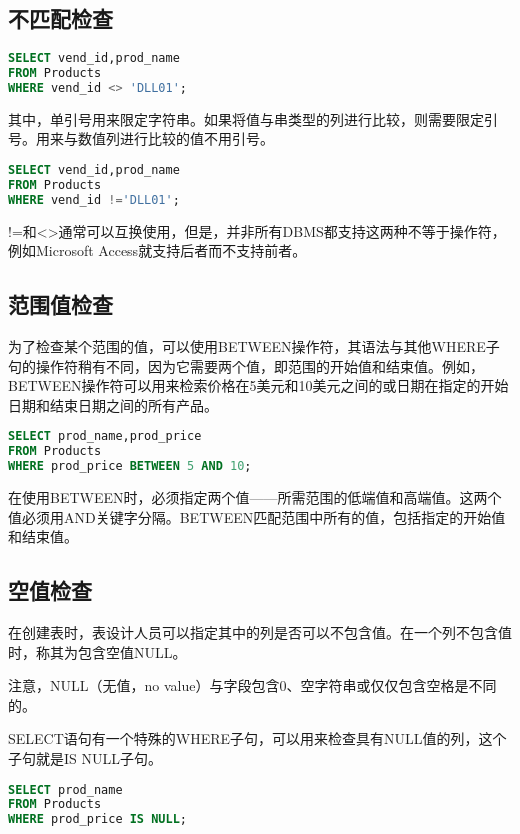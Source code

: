 \subsection{不匹配检查}

\begin{lstlisting}[language=SQL]
SELECT vend_id,prod_name
FROM Products
WHERE vend_id <> 'DLL01';
\end{lstlisting}

其中，单引号用来限定字符串。如果将值与串类型的列进行比较，则需要限定引号。用来与数值列进行比较的值不用引号。

\begin{lstlisting}[language=SQL]
SELECT vend_id,prod_name
FROM Products
WHERE vend_id !='DLL01';
\end{lstlisting}

!\/=和<\/>通常可以互换使用，但是，并非所有DBMS都支持这两种不等于操作符，例如Microsoft Access就支持后者而不支持前者。


\subsection{范围值检查}


为了检查某个范围的值，可以使用BETWEEN操作符，其语法与其他WHERE子句的操作符稍有不同，因为它需要两个值，即范围的开始值和结束值。例如，BETWEEN操作符可以用来检索价格在5美元和10美元之间的或日期在指定的开始日期和结束日期之间的所有产品。


\begin{lstlisting}[language=SQL]
SELECT prod_name,prod_price
FROM Products
WHERE prod_price BETWEEN 5 AND 10;
\end{lstlisting}

在使用BETWEEN时，必须指定两个值——所需范围的低端值和高端值。这两个值必须用AND关键字分隔。BETWEEN匹配范围中所有的值，包括指定的开始值和结束值。
\subsection{空值检查}

在创建表时，表设计人员可以指定其中的列是否可以不包含值。在一个列不包含值时，称其为包含空值NULL。

注意，NULL（无值，no value）与字段包含0、空字符串或仅仅包含空格是不同的。

SELECT语句有一个特殊的WHERE子句，可以用来检查具有NULL值的列，这个子句就是IS NULL子句。

\begin{lstlisting}[language=SQL]
SELECT prod_name
FROM Products
WHERE prod_price IS NULL;
\end{lstlisting}

